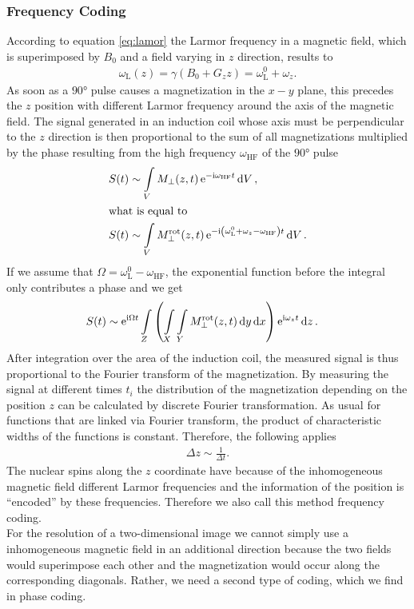 \subsubsection{Frequency Coding}
According to equation \ref{eq:lamor} the Larmor frequency in a magnetic field, which is superimposed by $B_0$ and a field varying in $z$ direction, results to
\begin{align}
\omega_\text{L}(z)=\gamma(B_0+G_zz)=\omega_\text{L}^0+\omega_z.
\end{align}
As soon as a $\ang{90}$ pulse causes a magnetization in the $x-y$ plane, this precedes the $z$ position with different Larmor frequency around the axis of the magnetic field.
The signal generated in an induction coil whose axis must be perpendicular to the $z$ direction is then proportional to the sum of all magnetizations multiplied by the phase resulting from the high frequency $\omega_\text{HF}$ of the $\ang{90}$ pulse
\begin{align}
S(t)&\sim\int\limits_V M_\bot(z,t)\,\mathrm{e}^{-\mathrm{i}\omega_\text{HF}t}\dd{V},\\
\intertext{what is equal to}
S(t)&\sim\int\limits_V M_\bot^\text{rot}(z,t)\,\mathrm{e}^{-\mathrm{i}\left(\omega_\text{L}^0+\omega_z-\omega_\text{HF}\right)t}\dd{V}.
\end{align}
If we assume that $\Omega=\omega_\text{L}^0-\omega_\text{HF}$, the exponential function before the integral only contributes a phase and we get
\begin{align}
S(t)&\sim\mathrm{e}^{\mathrm{i}\Omega t}\int\limits_Z\left(\int\limits_X\int\limits_Y M_\bot^\text{rot}(z,t)\dd{y}\dd{x}\right)\mathrm{e}^{\mathrm{i}\omega_z t}\dd{z}.
\end{align}
After integration over the area of the induction coil, the measured signal is thus proportional to the Fourier transform of the magnetization.
By measuring the signal at different times $t_i$ the distribution of the magnetization depending on the position $z$ can be calculated by discrete Fourier transformation.
As usual for functions that are linked via Fourier transform, the product of characteristic widths of the functions is constant.
Therefore, the following applies
\begin{align}
\Delta z\sim\frac{1}{\Delta t}.
\end{align}
The nuclear spins along the $z$ coordinate have because of the inhomogeneous magnetic field different Larmor frequencies and the information of the position is \enquote{encoded} by these frequencies.
Therefore we also call this method frequency coding.\\
For the resolution of a two-dimensional image we cannot simply use a inhomogeneous magnetic field in an additional direction because the two fields would superimpose each other and the magnetization would occur along the corresponding diagonals.
Rather, we need a second type of coding, which we find in phase coding.

